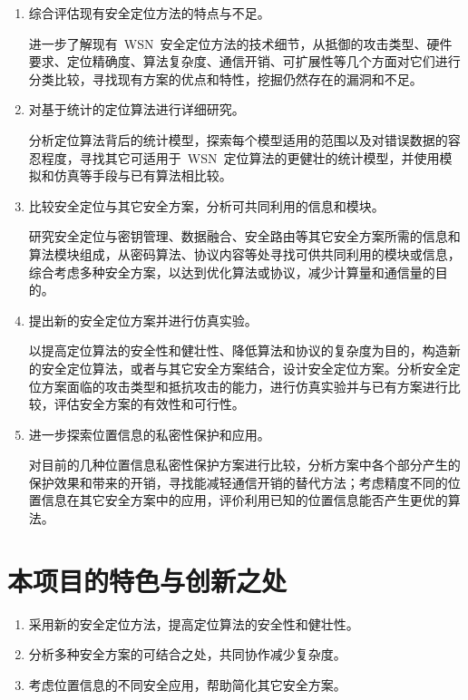 \documentclass[a4paper,10pt]{article}
\begin{document}
\begin{enumerate}

\item 综合评估现有安全定位方法的特点与不足。

进一步了解现有~WSN~安全定位方法的技术细节，从抵御的攻击类型、硬件要求、定位精确度、算法复杂度、通信开销、可扩展性等几个方面对它们进行分类比较，寻找现有方案的优点和特性，挖掘仍然存在的漏洞和不足。

\item 对基于统计的定位算法进行详细研究。

分析定位算法背后的统计模型，探索每个模型适用的范围以及对错误数据的容忍程度，寻找其它可适用于~WSN~定位算法的更健壮的统计模型，并使用模拟和仿真等手段与已有算法相比较。

\item 比较安全定位与其它安全方案，分析可共同利用的信息和模块。

研究安全定位与密钥管理、数据融合、安全路由等其它安全方案所需的信息和算法模块组成，从密码算法、协议内容等处寻找可供共同利用的模块或信息，综合考虑多种安全方案，以达到优化算法或协议，减少计算量和通信量的目的。

\item 提出新的安全定位方案并进行仿真实验。

以提高定位算法的安全性和健壮性、降低算法和协议的复杂度为目的，构造新的安全定位算法，或者与其它安全方案结合，设计安全定位方案。分析安全定位方案面临的攻击类型和抵抗攻击的能力，进行仿真实验并与已有方案进行比较，评估安全方案的有效性和可行性。

\item 进一步探索位置信息的私密性保护和应用。

对目前的几种位置信息私密性保护方案进行比较，分析方案中各个部分产生的保护效果和带来的开销，寻找能减轻通信开销的替代方法；考虑精度不同的位置信息在其它安全方案中的应用，评价利用已知的位置信息能否产生更优的算法。
\end{enumerate}

\section{本项目的特色与创新之处} 

\begin{enumerate}
\item 采用新的安全定位方法，提高定位算法的安全性和健壮性。
\item 分析多种安全方案的可结合之处，共同协作减少复杂度。
\item 考虑位置信息的不同安全应用，帮助简化其它安全方案。
\end{enumerate}



\end{document}
